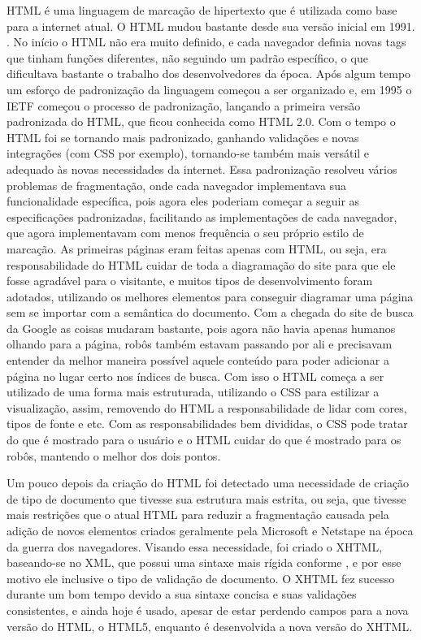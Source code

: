 HTML é uma linguagem de marcação de hipertexto que é utilizada como base para a internet
atual. O HTML mudou bastante desde sua versão inicial em 1991. \cite{powell2003html}.
No início o HTML não era muito definido, e cada
navegador definia novas tags que tinham funções diferentes,
não seguindo um padrão específico, o que dificultava
bastante o trabalho dos desenvolvedores da época.
Após algum tempo um esforço de padronização da linguagem
começou a ser organizado e, em 1995 o IETF começou o processo de
padronização, lançando a primeira versão padronizada do HTML, que ficou conhecida como HTML 2.0.
Com o tempo o HTML foi se tornando mais padronizado, ganhando validações e novas integrações
(com CSS por exemplo), tornando-se também mais versátil e adequado às novas necessidades da
internet.
Essa padronização resolveu vários problemas de fragmentação, onde cada
navegador implementava sua funcionalidade específica, pois agora
eles poderiam começar a seguir as especificações padronizadas,
facilitando as implementações de cada navegador, que agora implementavam com
menos frequência o seu próprio estilo de marcação.
As primeiras páginas eram feitas apenas com HTML, ou seja, era
responsabilidade do HTML cuidar de toda a diagramação do site para que
ele fosse agradável para o visitante, e muitos tipos de
desenvolvimento foram adotados, utilizando os melhores elementos para
conseguir diagramar uma página sem se importar com a semântica do
documento. Com a chegada do site de busca da Google as coisas mudaram bastante, pois
agora não havia apenas humanos olhando para a página, robôs também
estavam passando por ali e precisavam entender da melhor maneira
possível aquele conteúdo para poder adicionar a página no lugar certo
nos índices de busca. Com isso o HTML começa a ser utilizado de uma
forma mais estruturada, utilizando o CSS para estilizar a visualização,
assim, removendo do HTML a responsabilidade de lidar com cores, tipos de
fonte e etc. Com as responsabilidades bem divididas, o CSS pode tratar
do que é mostrado para o usuário e o HTML cuidar do que é mostrado
para os robôs, mantendo o melhor dos dois pontos.

Um pouco depois da criação do HTML foi detectado uma necessidade de
criação de tipo de documento que tivesse sua estrutura mais estrita,
ou seja, que tivesse mais restrições que o atual HTML para reduzir a
fragmentação causada pela adição de novos elementos criados geralmente
pela Microsoft e Netstape na época da guerra dos navegadores. Visando
essa necessidade, foi criado o XHTML, baseando-se no XML, que
possui uma sintaxe mais rígida conforme , e por esse
motivo ele inclusive o tipo de validação de documento.
O XHTML fez sucesso durante um bom tempo devido a sua sintaxe concisa e
suas validações consistentes, e ainda hoje é usado, apesar de estar
perdendo campos para a nova versão do HTML, o HTML5, enquanto é
desenvolvida a nova versão do XHTML.

